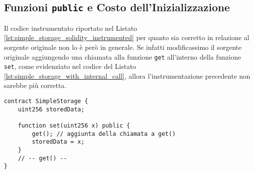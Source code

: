 \documentclass[12pt,a4paper,openright,oneside]{report}
\theoremstyle{definition}
\begin{document}
\subsection{Funzioni \texttt{public} e Costo dell'Inizializzazione}\label{impl:instrumentation:public}
Il codice instrumentato riportato nel Listato \ref{lst:simple_storage_solidity_instrumented} per quanto sia corretto in relazione al sorgente originale non lo \`{e} per\`{o} in generale. Se infatti modificassimo il sorgente originale aggiungendo una chiamata alla funzione \texttt{get} all'interno della funzione \texttt{set}, come evidenziato nel codice del Listato \ref{lst:simple_storage_with_internal_call}, allora l'instrumentazione precedente non sarebbe pi\`{u} corretta. 
\begin{lstlisting}[language=Solidity,caption=Parziale modifica di \ref{lst:simple_storage_solidity},label={lst:simple_storage_with_internal_call},frame=tlrb]
contract SimpleStorage {
    uint256 storedData;

    function set(uint256 x) public {
        get(); // aggiunta della chiamata a get()
        storedData = x;
    }
    // -- get() --
}
\end{lstlisting}
\end{document}
